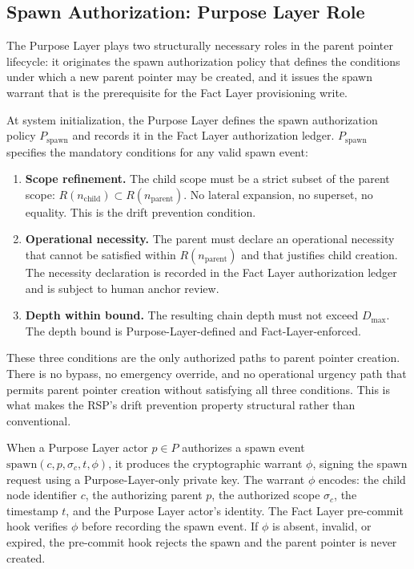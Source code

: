 \subsection{Spawn Authorization: Purpose Layer Role}
\label{sec:purpose-layer-spawn-authorization}

The Purpose Layer plays two structurally necessary roles in the parent pointer lifecycle: it originates the spawn authorization policy that defines the conditions under which a new parent pointer may be created, and it issues the spawn warrant that is the prerequisite for the Fact Layer provisioning write.

At system initialization, the Purpose Layer defines the spawn authorization policy $P_{\mathrm{spawn}}$ and records it in the Fact Layer authorization ledger. $P_{\mathrm{spawn}}$ specifies the mandatory conditions for any valid spawn event:

\begin{enumerate}
    \item[(S1)] \textbf{Scope refinement.} The child scope must be a strict subset of the parent scope: $R(n_{\mathrm{child}}) \subset R(n_{\mathrm{parent}})$. No lateral expansion, no superset, no equality. This is the drift prevention condition.

    \item[(S2)] \textbf{Operational necessity.} The parent must declare an operational necessity that cannot be satisfied within $R(n_{\mathrm{parent}})$ and that justifies child creation. The necessity declaration is recorded in the Fact Layer authorization ledger and is subject to human anchor review.

    \item[(S3)] \textbf{Depth within bound.} The resulting chain depth must not exceed $D_{\max}$. The depth bound is Purpose-Layer-defined and Fact-Layer-enforced.
\end{enumerate}

These three conditions are the only authorized paths to parent pointer creation. There is no bypass, no emergency override, and no operational urgency path that permits parent pointer creation without satisfying all three conditions. This is what makes the RSP's drift prevention property structural rather than conventional.

When a Purpose Layer actor $p \in P$ authorizes a spawn event $\mathrm{spawn}(c, p, \sigma_c, t, \phi)$, it produces the cryptographic warrant $\phi$, signing the spawn request using a Purpose-Layer-only private key. The warrant $\phi$ encodes: the child node identifier $c$, the authorizing parent $p$, the authorized scope $\sigma_c$, the timestamp $t$, and the Purpose Layer actor's identity. The Fact Layer pre-commit hook verifies $\phi$ before recording the spawn event. If $\phi$ is absent, invalid, or expired, the pre-commit hook rejects the spawn and the parent pointer is never created.

